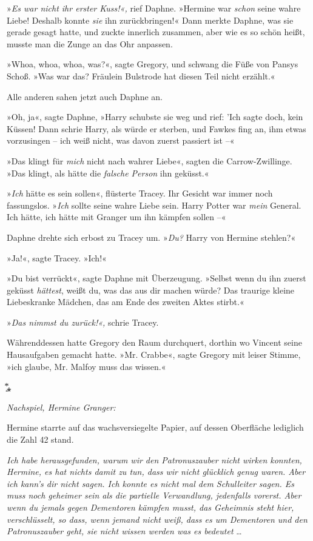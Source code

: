 {»\emph{Es war nicht ihr erster Kuss!«,} rief Daphne. »Hermine war \emph{schon} seine wahre Liebe! Deshalb konnte \emph{sie} ihn zurückbringen!« Dann merkte Daphne, was sie gerade gesagt hatte, und zuckte innerlich zusammen, aber wie es so schön heißt, musste man die Zunge an das Ohr anpassen.

»Whoa, whoa, whoa, was?«, sagte Gregory, und schwang die Füße von Pansys Schoß. »Was war das? Fräulein Bulstrode hat diesen Teil nicht erzählt.«

Alle anderen sahen jetzt auch Daphne an.

»Oh, ja«, sagte Daphne, »Harry schubste sie weg und rief: 'Ich sagte doch, kein Küssen! Dann schrie Harry, als würde er sterben, und Fawkes fing an, ihm etwas vorzusingen -- ich weiß nicht, was davon zuerst passiert ist --«

»Das klingt für \emph{mich} nicht nach wahrer Liebe«, sagten die Carrow-Zwillinge. »Das klingt, als hätte die \emph{falsche Person} ihn geküsst.«

»\emph{Ich} hätte es sein sollen«, flüsterte Tracey. Ihr Gesicht war immer noch fassungslos. »\emph{Ich} sollte seine wahre Liebe sein. Harry Potter war \emph{mein} General. Ich hätte, ich hätte mit Granger um ihn kämpfen sollen --«

Daphne drehte sich erbost zu Tracey um. »\emph{Du?} Harry von Hermine stehlen?«

»Ja!«, sagte Tracey. »Ich!«

»Du bist verrückt«, sagte Daphne mit Überzeugung. »Selbst wenn du ihn zuerst geküsst \emph{hättest}, weißt du, was das aus dir machen würde? Das traurige kleine Liebeskranke Mädchen, das am Ende des zweiten Aktes stirbt.«

»\emph{Das nimmst du zurück!«,} schrie Tracey.

Währenddessen hatte Gregory den Raum durchquert, dorthin wo Vincent seine Hausaufgaben gemacht hatte. »Mr. Crabbe«, sagte Gregory mit leiser Stimme, »ich glaube, Mr. Malfoy muss das wissen.«

͙⃰⁎

\emph{Nachspiel, Hermine Granger:}

Hermine starrte auf das wachsversiegelte Papier, auf dessen Oberfläche lediglich die Zahl 42 stand.

\emph{Ich habe herausgefunden, warum wir den Patronuszauber nicht wirken konnten, Hermine, es hat nichts damit zu tun, dass wir nicht glücklich genug waren. Aber ich kann's dir nicht sagen. Ich konnte es nicht mal dem Schulleiter sagen. Es muss noch geheimer sein als die partielle Verwandlung, jedenfalls vorerst. Aber wenn du jemals gegen Dementoren kämpfen musst, das Geheimnis steht hier, verschlüsselt, so dass, wenn jemand nicht weiß, dass es um Dementoren und den Patronuszauber geht, sie nicht wissen werden was es bedeutet} …

}
